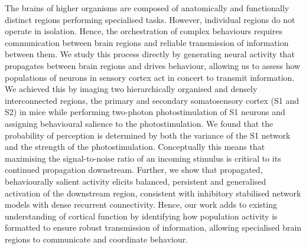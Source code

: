 The brains of higher organisms are composed of anatomically and functionally distinct regions performing specialised tasks. However, individual regions do not operate in isolation. Hence, the orchestration of complex behaviours requires communication between brain regions and reliable transmission of information between them. We study this process directly by generating neural activity that propagates between brain regions and drives behaviour, allowing us to assess how populations of neurons in sensory cortex act in concert to transmit information. We achieved this by imaging two hierarchically organised and densely interconnected regions, the primary and secondary somatosensory cortex (S1 and S2) in mice while performing two-photon photostimulation of S1 neurons and assigning behavioural salience to the photostimulation. We found that the probability of perception is determined by both the variance of the S1 network and the strength of the photostimulation. Conceptually this means that maximising the signal-to-noise ratio of an incoming stimulus is critical to its continued propagation downstream. Further, we show that propagated, behaviourally salient activity elicits balanced, persistent and generalised activation of the downstream region, consistent with inhibitory stabilised network models with dense recurrent connectivity. Hence, our work adds to existing understanding of cortical function by identifying how population activity is formatted to ensure robust transmission of information, allowing specialised brain regions to communicate and coordinate behaviour.